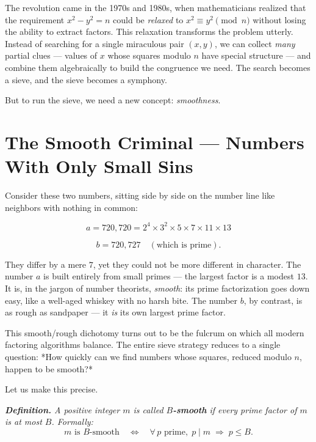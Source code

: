 \documentclass[11pt,openright,twoside]{book}
\renewenvironment{quotation}{%
  \par\vspace{8pt}%
  \begin{list}{}{%
    \setlength{\leftmargin}{2em}%
    \setlength{\rightmargin}{2em}%
  }\item[]\itshape\color{pullquote}%
}{%
  \end{list}%
  \par\vspace{8pt}%
}
\theoremstyle{definition}
\begin{document}
The revolution came in the 1970s and 1980s, when mathematicians realized that the requirement $x^2 - y^2 = n$ could be \textit{relaxed} to $x^2 \equiv y^2 \pmod{n}$ without losing the ability to extract factors. This relaxation transforms the problem utterly. Instead of searching for a single miraculous pair $(x, y)$, we can collect \textit{many} partial clues --- values of $x$ whose squares modulo $n$ have special structure --- and combine them algebraically to build the congruence we need. The search becomes a sieve, and the sieve becomes a symphony.

But to run the sieve, we need a new concept: \textit{smoothness}.


\bigskip


\section{The Smooth Criminal — Numbers With Only Small Sins}

Consider these two numbers, sitting side by side on the number line like neighbors with nothing in common:

\[a = 720{,}720 = 2^4 \times 3^2 \times 5 \times 7 \times 11 \times 13\]

\[b = 720{,}727 \quad (\text{which is prime}).\]

They differ by a mere $7$, yet they could not be more different in character. The number $a$ is built entirely from small primes --- the largest factor is a modest $13$. It is, in the jargon of number theorists, \textit{smooth}: its prime factorization goes down easy, like a well-aged whiskey with no harsh bite. The number $b$, by contrast, is as rough as sandpaper --- it \textit{is} its own largest prime factor.

This smooth/rough dichotomy turns out to be the fulcrum on which all modern factoring algorithms balance. The entire sieve strategy reduces to a single question: *How quickly can we find numbers whose squares, reduced modulo $n$, happen to be smooth?*

Let us make this precise.

\begin{quotation}
\noindent\itshape \textbf{Definition.} A positive integer $m$ is called \textbf{$B$-smooth} if every prime factor of $m$ is at most $B$. Formally: $$m \text{ is } B\text{-smooth} \quad\Longleftrightarrow\quad \forall\, p \text{ prime},\; p \mid m \;\Rightarrow\; p \leq B.$$
\end{quotation}
\end{document}
